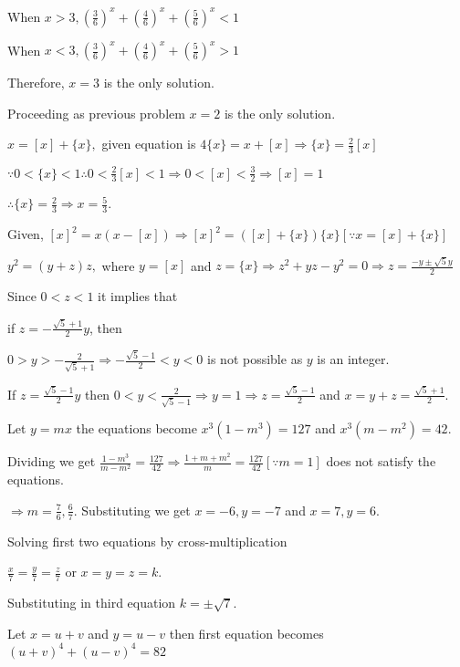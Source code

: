   When $x > 3, \left(\frac{3}{6}\right)^x + \left(\frac{4}{6}\right)^x + \left(\frac{5}{6}\right)^x < 1$

  When $x < 3, \left(\frac{3}{6}\right)^x + \left(\frac{4}{6}\right)^x + \left(\frac{5}{6}\right)^x > 1$

  Therefore, $x = 3$ is the only solution.
\item Proceeding as previous problem $x = 2$ is the only solution.
\item $x = [x] + \{x\},$ given equation is $4\{x\} = x + [x] \Rightarrow \{x\} = \frac{2}{3}[x]$

  $\because 0 < \{x\} < 1 \therefore 0 < \frac{2}{3}[x] < 1 \Rightarrow 0 < [x] < \frac{3}{2} \Rightarrow
  [x] = 1$

  $\therefore \{x\} = \frac{2}{3} \Rightarrow x = \frac{5}{3}$.
\item Given, $[x]^2 = x(x - [x])\Rightarrow [x]^2 = ([x] + \{x\})\{x\} [\because x = [x] + \{x\}]$

  $y^2 = (y + z)z,$ where $y = [x]$ and $z = \{x\}\Rightarrow z^2 + yz - y^2 = 0 \Rightarrow z = \frac{-y
  \pm \sqrt{5}y}{2}$

  Since $0 < z < 1$ it implies that

  if $z = -\frac{\sqrt{5} + 1}{2}y$, then

  $0 > y > -\frac{2}{\sqrt{5} + 1}\Rightarrow -\frac{\sqrt{5} - 1}{2} < y < 0$ is not possible as $y$ is an
  integer.

  If $z = \frac{\sqrt{5} - 1}{2}y$ then $0 < y < \frac{2}{\sqrt{5} - 1} \Rightarrow y = 1\Rightarrow z =
  \frac{\sqrt{5} - 1}{2}$ and $x = y + z = \frac{\sqrt{5} + 1}{2}$.
\item Let $y = mx$ the equations become $x^3(1 - m^3) = 127$ and $x^3(m - m^2) = 42$.

  Dividing we get $\frac{1 - m^3}{m - m^2} = \frac{127}{42}\Rightarrow \frac{1 + m + m^2}{m} =
  \frac{127}{42} [\because m = 1]$ does not satisfy the equations.

  $\Rightarrow m = \frac{7}{6}, \frac{6}{7}$. Substituting we get $x = -6, y = -7$ and $x = 7, y = 6$.
\item Solving first two equations by cross-multiplication

  $\frac{x}{7} = \frac{y}{7} = \frac{z}{7}$ or $x = y = z = k$.

  Substituting in third equation $k = \pm \sqrt{7}$.
\item Let $x = u + v$ and $y = u - v$ then first equation becomes $(u + v)^4 + (u - v)^4 = 82$

